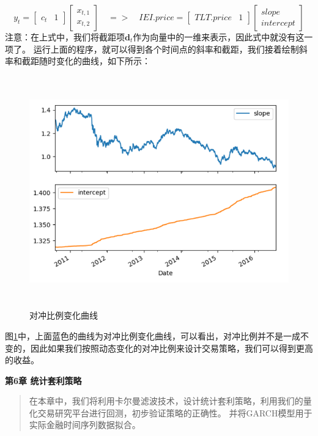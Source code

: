 \documentclass{article}
\begin{document}
\begin{equation}
y_{t}=\begin{bmatrix}
c_{t} & 1
\end{bmatrix}\begin{bmatrix}
x_{t,1} \\
x_{t,2}
\end{bmatrix} \quad => \quad IEI.price=\begin{bmatrix}
TLT.price & 1
\end{bmatrix}\begin{bmatrix}
slope \\
intercept
\end{bmatrix}
\label{e000081}
\end{equation}
注意：在上式中，我们将截距项$\boldsymbol{d}_{t}$作为向量中的一维来表示，因此式中就没有这一项了。\newline
运行上面的程序，就可以得到各个时间点的斜率和截距，我们接着绘制斜率和截距随时变化的曲线，如下所示：
\begin{figure}[H]
	\caption{对冲比例变化曲线}
	\label{f000057}
	\centering
	\includegraphics[height=10cm]{images/f000057}
\end{figure}
图\ref{f000057}中，上面蓝色的曲线为对冲比例变化曲线，可以看出，对冲比例并不是一成不变的，因此如果我们按照动态变化的对冲比例来设计交易策略，我们可以得到更高的收益。

\maketitle\begin{center}
\Large \textbf{第6章 统计套利策略}
\end{center}
\begin{abstract}
在本章中，我们将利用卡尔曼滤波技术，设计统计套利策略，利用我们的量化交易研究平台进行回测，初步验证策略的正确性。
并将GARCH模型用于实际金融时间序列数据拟合。
\end{abstract}
\end{document}
